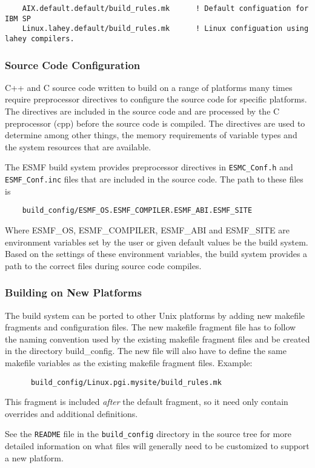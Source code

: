 \begin{verbatim}
    AIX.default.default/build_rules.mk      ! Default configuation for IBM SP
    Linux.lahey.default/build_rules.mk      ! Linux configuation using lahey compilers.
\end{verbatim}

\subsubsection{Source Code Configuration}

C++ and C source code written to build on a range of platforms many
times require preprocessor directives to configure the source code for
specific platforms.  The directives are included in the source code
and are processed by the C preprocessor (cpp) before the source code
is compiled.  The directives are used to determine among other things,
the memory requirements of variable types and the system resources
that are available.

The ESMF build system provides preprocessor directives in 
{\tt ESMC\_Conf.h} and {\tt ESMF\_Conf.inc} files
that are included in the source code.  The path to these files is

\begin{verbatim}
    build_config/ESMF_OS.ESMF_COMPILER.ESMF_ABI.ESMF_SITE
\end{verbatim}

Where ESMF\_OS, ESMF\_COMPILER, ESMF\_ABI and ESMF\_SITE are
environment variables set by the user or given default values be the
build system.  Based on the settings of these environment variables,
the build system provides a path to the correct files during
source code compiles.

\subsubsection{Building on New Platforms}

The build system can be ported to other Unix platforms by adding new
makefile fragments and configuration files.  The new makefile fragment 
file has to follow the naming
convention used by the existing makefile fragment files and be created in the
directory build\_config.  The new file will also have to define
the same makefile variables as the existing makefile fragment files.
Example:

\begin{verbatim}
      build_config/Linux.pgi.mysite/build_rules.mk
\end{verbatim}

This fragment is included {\it after} the default fragment, so it need
only contain overrides and additional definitions.

See the {\tt README} file in the {\tt build\_config} directory in the
source tree for more detailed information on what files will generally
need to be customized to support a new platform.


